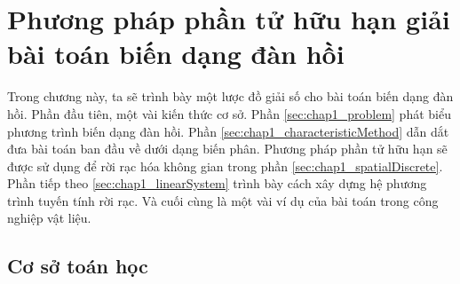 
\chapter{Phương pháp phần tử hữu hạn giải bài toán biến dạng đàn hồi}\label{Chapter1}
\renewcommand{\baselinestretch}{1.25}
\minitoc
\renewcommand{\baselinestretch}{1.5}
Trong chương này, ta sẽ trình bày một lược đồ giải số cho bài toán biến dạng đàn hồi. Phần đầu tiên, một vài kiến thức cơ sở. Phần \ref{sec:chap1_problem} phát biểu phương trình biến dạng đàn hồi. Phần \ref{sec:chap1_characteristicMethod} dẫn dắt đưa bài toán ban đầu về dưới dạng biến phân. Phương pháp phần tử hữu hạn sẽ được sử dụng để rời rạc hóa không gian trong phần \ref{sec:chap1_spatialDiscrete}. Phần tiếp theo \ref{sec:chap1_linearSystem} trình bày cách xây dựng hệ phương trình tuyến tính rời rạc. Và cuối cùng là một vài ví dụ của bài toán trong công nghiệp vật liệu.

\section{Cơ sở toán học}
